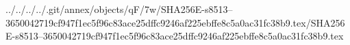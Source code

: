 ../../../../.git/annex/objects/qF/7w/SHA256E-s8513--3650042719cf947f1ec5f96c83ace25dffc9246af225ebffe8c5a0ac31fc38b9.tex/SHA256E-s8513--3650042719cf947f1ec5f96c83ace25dffc9246af225ebffe8c5a0ac31fc38b9.tex